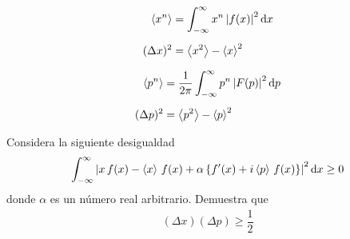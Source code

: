 \begin{enumerate}
\begin{minipage}{0.4\linewidth}
\begin{align*}
\expval{x^{n}} &= \int_{-\infty}^{\infty} x^{n} \, \abs{f(x)}^{2} \dd{x} \\[0.5em]
(\Delta x)^{2} &= \expval{x^{2}} - \expval{x}^{2}
\end{align*}
\end{minipage} \hspace{0.3cm}
\begin{minipage}{0.4\linewidth}
\begin{align*}
\expval{p^{n}} &= \dfrac{1}{2 \pi} \int_{-\infty}^{\infty} p^{n} \, \abs{F(p)}^{2} \dd{p} \\[0.5em]
(\Delta p)^{2} &= \expval{p^{2}} - \expval{p}^{2}
\end{align*}
\end{minipage}

Considera la siguiente desigualdad
\begin{align*}
\int_{-\infty}^{\infty} \abs{x \, f(x) - \expval{x} \, f(x)  + \alpha \left\{ f^{\prime}(x) + i \expval{p} \, f(x) \right\}}^{2} \dd{x} \geq 0
\end{align*}
donde $\alpha$ es un número real arbitrario. Demuestra que
\begin{align*}
(\Delta x) (\Delta p) \geq \dfrac{1}{2}
\end{align*}
\end{enumerate}
